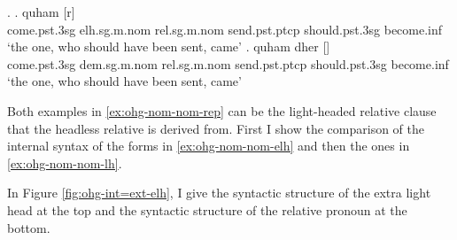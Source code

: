 \ex.\label{ex:ohg-nom-nom-rep}
\ag. quham [r]    \\
 come.\ac{pst}.3\ac{sg}\scsub{[nom]} \ac{elh}.\ac{sg}.\ac{m}.\ac{nom} \ac{rel}.\ac{sg}.\ac{m}.\ac{nom} send.\ac{pst}.\ac{ptcp}\scsub{[nom]} should.\ac{pst}.3\ac{sg} become.\ac{inf}\\
 `the one, who should have been sent, came' \label{ex:ohg-nom-nom-elh}
\bg. quham dher []   \\
 come.\ac{pst}.3\ac{sg}\scsub{[nom]} \ac{dem}.\ac{sg}.\ac{m}.\ac{nom} \ac{rel}.\ac{sg}.\ac{m}.\ac{nom} send.\ac{pst}.\ac{ptcp}\scsub{[nom]} should.\ac{pst}.3\ac{sg} become.\ac{inf}\\
 `the one, who should have been sent, came' \label{ex:ohg-nom-nom-lh}

Both examples in \ref{ex:ohg-nom-nom-rep} can be the light-headed relative clause that the headless relative is derived from. First I show the comparison of the internal syntax of the forms in \ref{ex:ohg-nom-nom-elh} and then the ones in \ref{ex:ohg-nom-nom-lh}.

In Figure \ref{fig:ohg-int=ext-elh}, I give the syntactic structure of the extra light head at the top and the syntactic structure of the relative pronoun at the bottom.

